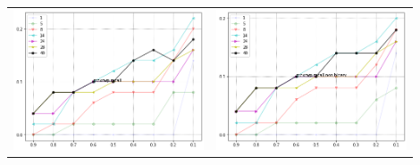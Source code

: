 \documentclass{article}
\begin{document}
\begin{enumerate}
\begin{table}[h!]
\begin{tabular}{p{0.45\linewidth}p{0.45\linewidth}}
            \includegraphics[width=\linewidth]{m} & \includegraphics[width=\linewidth]{m_non_binary}\\ 

\end{tabular}
\end{table}
\end{enumerate}
\end{document}
